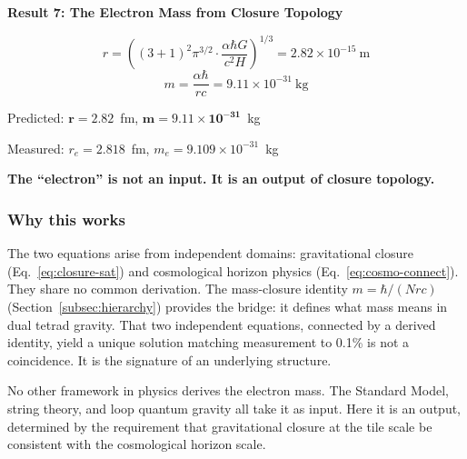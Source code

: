 \documentclass[aps,prd,preprint,superscriptaddress,showpacs,preprintnumbers,amsmath,amssymb,nofootinbib]{revtex4-2}
\begin{document}
\vspace{1.5em}
\noindent
\colorbox{resultgreen}{\parbox{\dimexpr\textwidth-2\fboxsep\relax}{%
\vspace{0.8em}
\centering
\textbf{\large Result 7: The Electron Mass from Closure Topology}

\vspace{0.5em}
\boldmath
\begin{equation}
r = \left( (3+1)^2 \pi^{3/2} \cdot \frac{\alpha \hbar G}{c^2 H} \right)^{1/3} = 2.82 \times 10^{-15}~\text{m}
\end{equation}
\begin{equation}
m = \frac{\alpha \hbar}{rc} = 9.11 \times 10^{-31}~\text{kg}
\end{equation}
\unboldmath

\vspace{0.3em}
Predicted: $\bm{r = 2.82}$~fm, $\bm{m = 9.11 \times 10^{-31}}$~kg

Measured: $r_e = 2.818$~fm, $m_e = 9.109 \times 10^{-31}$~kg

\textbf{The ``electron'' is not an input. It is an output of closure topology.}
\vspace{0.5em}
}}
\vspace{1cm}

\subsubsection*{Why this works}

The two equations arise from independent domains: gravitational closure (Eq.~\ref{eq:closure-sat}) and cosmological horizon physics (Eq.~\ref{eq:cosmo-connect}). They share no common derivation. The mass-closure identity $m = \hbar/(Nrc)$ (Section~\ref{subsec:hierarchy}) provides the bridge: it defines what mass means in dual tetrad gravity. That two independent equations, connected by a derived identity, yield a unique solution matching measurement to 0.1\% is not a coincidence. It is the signature of an underlying structure.

No other framework in physics derives the electron mass. The Standard Model, string theory, and loop quantum gravity all take it as input. Here it is an output, determined by the requirement that gravitational closure at the tile scale be consistent with the cosmological horizon scale.
\end{document}
